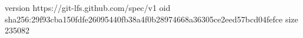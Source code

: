 version https://git-lfs.github.com/spec/v1
oid sha256:29f93cba150fdfe26095440fb38a4f0b28974668a36305ce2eed57bcd04fefce
size 235082
